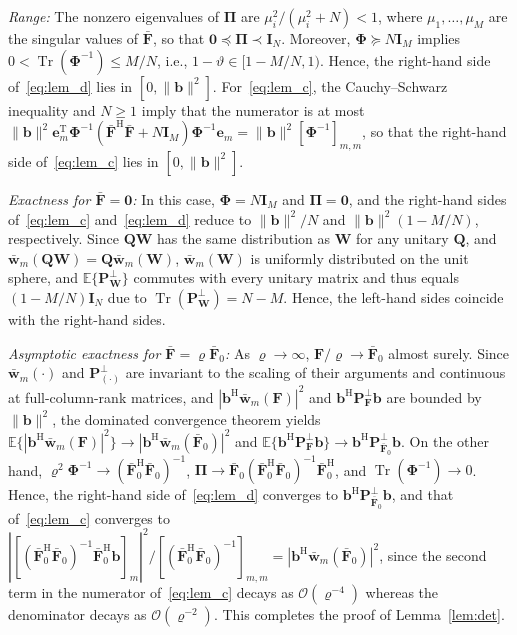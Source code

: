 \documentclass[journal]{IEEEtran}
\newcommand{\E}{\mathbb{E}}
\newcommand{\tr}{\operatorname{Tr}}
\newcommand{\bI}{\mathbf{I}}
\newcommand{\wb}{\bar{\mathbf{w}}}
\newcommand{\be}{\mathbf{e}}
\newcommand{\bb}{\mathbf{b}}
\newcommand{\bF}{\mathbf{F}}
\newcommand{\Fb}{\bar{\mathbf{F}}}
\newcommand{\bW}{\mathbf{W}}
\newcommand{\bPhi}{\boldsymbol{\Phi}}
\newcommand{\bPi}{\boldsymbol{\Pi}}
\begin{document}
\begin{IEEEproof}
\textit{Range:} The nonzero eigenvalues of $\bPi$ are $\mu_i^2/(\mu_i^2+N)<1$, where $\mu_1,\ldots,\mu_M$ are the singular values of $\Fb$, so that $\mathbf 0\preceq\bPi\prec\bI_N$. Moreover, $\bPhi\succeq N\bI_M$ implies $0<\tr(\bPhi^{-1})\le M/N$, i.e., $1-\vartheta\in[1-M/N,1)$. Hence, the right-hand side of~\eqref{eq:lem_d} lies in $[0,\|\bb\|^2]$. For~\eqref{eq:lem_c}, the Cauchy--Schwarz inequality and $N\ge1$ imply that the numerator is at most $\|\bb\|^2\be_m^{\mathrm{T}}\bPhi^{-1}(\Fb^{\mathrm{H}}\Fb+N\bI_M)\bPhi^{-1}\be_m=\|\bb\|^2[\bPhi^{-1}]_{m,m}$, so that the right-hand side of~\eqref{eq:lem_c} lies in $[0,\|\bb\|^2]$.

\textit{Exactness for $\Fb=\mathbf 0$:} In this case, $\bPhi=N\bI_M$ and $\bPi=\mathbf 0$, and the right-hand sides of~\eqref{eq:lem_c} and~\eqref{eq:lem_d} reduce to $\|\bb\|^2/N$ and $\|\bb\|^2(1-M/N)$, respectively. Since $\mathbf Q\bW$ has the same distribution as $\bW$ for any unitary $\mathbf Q$, and $\wb_m(\mathbf Q\bW)=\mathbf Q\wb_m(\bW)$, $\wb_m(\bW)$ is uniformly distributed on the unit sphere, and $\E\{\mathbf P_{\bW}^\perp\}$ commutes with every unitary matrix and thus equals $(1-M/N)\bI_N$ due to $\tr(\mathbf P_{\bW}^\perp)=N-M$. Hence, the left-hand sides coincide with the right-hand sides.

\textit{Asymptotic exactness for $\Fb=\varrho\Fb_0$:} As $\varrho\to\infty$, $\bF/\varrho\to\Fb_0$ almost surely. Since $\wb_m(\cdot)$ and $\mathbf P_{(\cdot)}^\perp$ are invariant to the scaling of their arguments and continuous at full-column-rank matrices, and $|\bb^{\mathrm{H}}\wb_m(\bF)|^2$ and $\bb^{\mathrm{H}}\mathbf P_{\bF}^\perp\bb$ are bounded by $\|\bb\|^2$, the dominated convergence theorem yields $\E\{|\bb^{\mathrm{H}}\wb_m(\bF)|^2\}\to|\bb^{\mathrm{H}}\wb_m(\Fb_0)|^2$ and $\E\{\bb^{\mathrm{H}}\mathbf P_{\bF}^\perp\bb\}\to\bb^{\mathrm{H}}\mathbf P_{\Fb_0}^\perp\bb$. On the other hand, $\varrho^2\bPhi^{-1}\to(\Fb_0^{\mathrm{H}}\Fb_0)^{-1}$, $\bPi\to\Fb_0(\Fb_0^{\mathrm{H}}\Fb_0)^{-1}\Fb_0^{\mathrm{H}}$, and $\tr(\bPhi^{-1})\to0$. Hence, the right-hand side of~\eqref{eq:lem_d} converges to $\bb^{\mathrm{H}}\mathbf P_{\Fb_0}^\perp\bb$, and that of~\eqref{eq:lem_c} converges to $|[(\Fb_0^{\mathrm{H}}\Fb_0)^{-1}\Fb_0^{\mathrm{H}}\bb]_m|^2/[(\Fb_0^{\mathrm{H}}\Fb_0)^{-1}]_{m,m}=|\bb^{\mathrm{H}}\wb_m(\Fb_0)|^2$, since the second term in the numerator of~\eqref{eq:lem_c} decays as $\mathcal O(\varrho^{-4})$ whereas the denominator decays as $\mathcal O(\varrho^{-2})$. This completes the proof of Lemma~\ref{lem:det}.
\end{IEEEproof}
\end{document}
